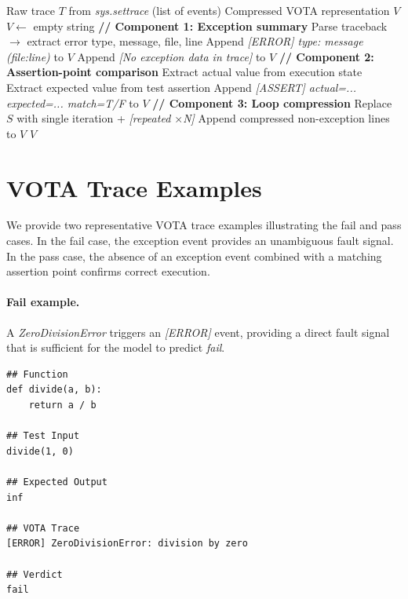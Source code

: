 \begin{algorithm}[h!]
\caption{VOTA Trace Extraction}
\label{alg:vota}
\small
\begin{algorithmic}[1]
\REQUIRE Raw trace $T$ from \textit{sys.settrace} (list of events)
\ENSURE Compressed VOTA representation $V$
\STATE $V \leftarrow$ empty string
\STATE \textbf{// Component 1: Exception summary}
  \STATE Parse traceback $\rightarrow$ extract error type, message, file, line
  \STATE Append \textit{[ERROR] type: message (file:line)} to $V$
\ENDFOR
{}
  \STATE Append \textit{[No exception data in trace]} to $V$
\ENDIF
\STATE \textbf{// Component 2: Assertion-point comparison}
  \STATE Extract actual value from execution state
  \STATE Extract expected value from test assertion
  \STATE Append \textit{[ASSERT] actual=... expected=... match=T/F} to $V$
\ENDFOR
\STATE \textbf{// Component 3: Loop compression}
    \STATE Replace $S$ with single iteration + \textit{[repeated $\times$N]}
  \ENDIF
\ENDFOR
\STATE Append compressed non-exception lines to $V$
\RETURN $V$
\end{algorithmic}
\end{algorithm}

\section{VOTA Trace Examples}
\label{sec:vota_examples}

We provide two representative VOTA trace examples illustrating the fail and pass cases.
In the fail case, the exception event provides an unambiguous fault signal.
In the pass case, the absence of an exception event combined with a matching assertion point confirms correct execution.

\paragraph{Fail example.}
A \textit{ZeroDivisionError} triggers an \textit{[ERROR]} event, providing a direct fault signal that is sufficient for the model to predict \textit{fail}.

\begin{scriptsize}
\begin{verbatim}
## Function
def divide(a, b):
    return a / b

## Test Input
divide(1, 0)

## Expected Output
inf

## VOTA Trace
[ERROR] ZeroDivisionError: division by zero

## Verdict
fail
\end{verbatim}
\end{scriptsize}

